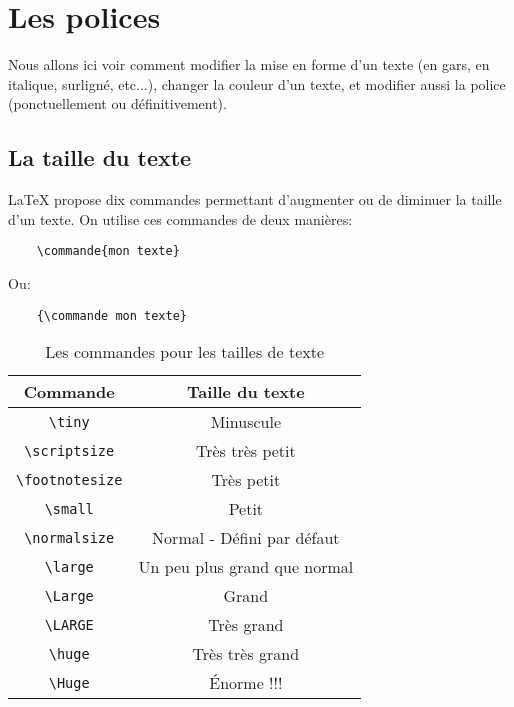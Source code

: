 
\chapter{Les polices}
Nous allons ici voir comment modifier la mise en forme d'un texte (en gars, en italique, surligné, etc...), changer la couleur d'un texte, et modifier aussi la police (ponctuellement ou définitivement).
\medskip

\section{La taille du texte}
\LaTeX{} propose dix commandes permettant d'augmenter ou de diminuer la taille d'un texte. On utilise ces commandes de deux manières:
\begin{verbatim}
    \commande{mon texte}
\end{verbatim}
\medskip

Ou:
\begin{verbatim}
    {\commande mon texte}
\end{verbatim}
\medskip

\begin{table}[h]
\begin{center}
\begin{tabular}{|c|c|}
\hline
\textbf{Commande} & \textbf{Taille du texte} \\
\hline
\verb|\tiny| & \tiny{Minuscule} \\
\hline
\verb|\scriptsize| & \scriptsize{Très très petit} \\
\hline
\verb|\footnotesize| & \footnotesize{Très petit} \\
\hline
\verb|\small| & \small{Petit} \\
\hline
\verb|\normalsize| & \normalsize{Normal} - Défini par défaut \\
\hline
\verb|\large| & \large{Un peu plus grand que normal} \\
\hline
\verb|\Large| & \Large{Grand} \\
\hline
\verb|\LARGE| & \LARGE{Très grand} \\
\hline
\verb|\huge| & \huge{Très très grand} \\
\hline
\verb|\Huge| & \Huge{Énorme !!!} \\
\hline
\end{tabular}
\caption{Les commandes pour les tailles de texte}
\end{center}
\end{table}
\medskip

